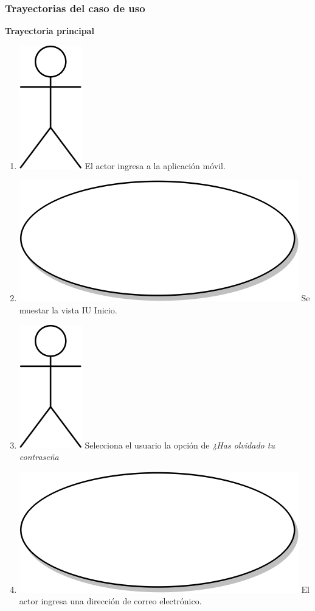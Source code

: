 \subsubsection{Trayectorias del caso de uso}
\textbf{Trayectoria principal}
\begin{enumerate}
  \item {\includegraphics[scale=.1]{Capitulo3/img/actor.png} El actor ingresa a la aplicación móvil.}
  \item {\includegraphics[scale=.05]{Capitulo3/img/proceso.png} Se muestar la vista IU Inicio.}
  \item {\includegraphics[scale=.1]{Capitulo3/img/actor.png} Selecciona el usuario la opción de \textit{¿Has olvidado tu contraseña}}
  \item {\includegraphics[scale=.05]{Capitulo3/img/proceso.png} El actor ingresa una dirección de correo electrónico.}

\end{enumerate}
